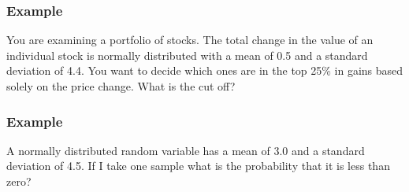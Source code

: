 \begin{frame}
  \frametitle{Example}

  You are examining a portfolio of stocks. The total change in the
  value of an individual stock is normally distributed with a mean of
  0.5 and a standard deviation of 4.4. You want to decide which ones
  are in the top 25\% in gains based solely on the price change. What
  is the cut off?

  \vfill


  \vfill


\end{frame}





\begin{frame}
  \frametitle{Example}

  A normally distributed random variable has a mean of 3.0 and a
  standard deviation of 4.5. If I take one sample what is the
  probability that it is less than zero?

  \vfill


  \vfill


%

\end{frame}

